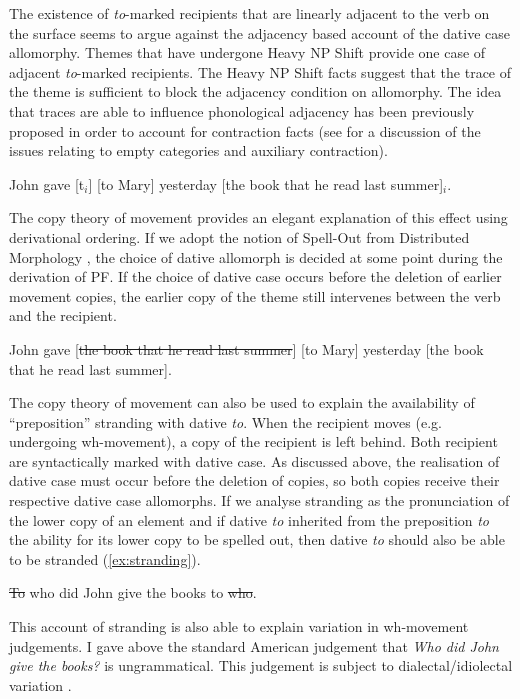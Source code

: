 The existence of \textit{to}-marked recipients that are linearly adjacent to the verb on the surface seems to argue against the adjacency based account of the dative case allomorphy. Themes that have undergone Heavy NP Shift provide one case of adjacent \textit{to}-marked recipients. The Heavy NP Shift facts suggest that the trace of the theme is sufficient to block the adjacency condition on allomorphy. The idea that traces are able to influence phonological adjacency has been previously proposed in order to account for contraction facts (see \cite{Barss.1995} for a discussion of the issues relating to empty categories and auxiliary contraction).
\begin{exe}
\ex John gave [t$_{i}$] [to Mary] yesterday [the book that he read last summer]$_{i}$.
\end{exe}
The copy theory of movement \citep{Chomsky.1993,Chomsky.1995,Corver.2007,Franks} provides an elegant explanation of this effect using derivational ordering. If we adopt the notion of Spell-Out from Distributed Morphology \citep{Halle.1993}, the choice of dative allomorph is decided at some point during the derivation of PF. If the choice of dative case occurs before the deletion of earlier movement copies, the earlier copy of the theme still intervenes between the verb and the recipient.
\begin{exe}
\ex John gave [\sout{the book that he read last summer}] [to Mary] yesterday [the book that he read last summer].
\end{exe}

The copy theory of movement can also be used to explain the availability of ``preposition'' stranding with dative \textit{to}. When the recipient moves (e.g. undergoing wh-movement), a copy of the recipient is left behind. Both recipient are syntactically marked with dative case. As discussed above, the realisation of dative case must occur before the deletion of copies, so both copies receive their respective dative case allomorphs. If we analyse stranding as the pronunciation of the lower copy of an element and if dative \textit{to} inherited from the preposition \textit{to} the ability for its lower copy to be spelled out, then dative \textit{to} should also be able to be stranded (\ref{ex:stranding}).

\begin{exe}
\ex\label{ex:stranding} \sout{To} who did John give the books to \sout{who}.
\end{exe}

This account of stranding is also able to explain variation in wh-movement judgements. I gave above the standard American judgement that \textit{Who did John give the books?} is ungrammatical.  This judgement is subject to dialectal/idiolectal variation \citep{Langendoen.1973,Hornstein.1981}. 

